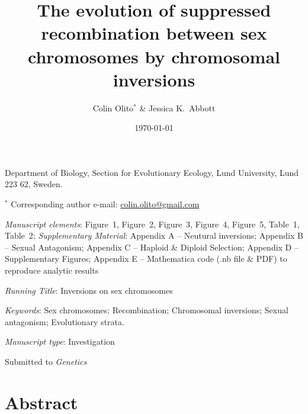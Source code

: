 \documentclass{article}
\title{The evolution of suppressed recombination between sex chromosomes by chromosomal inversions}
\author{Colin Olito$^{\ast}$ \& Jessica K.~Abbott}
\date{}
\begin{document}
\maketitle

\noindent{} Department of Biology, Section for Evolutionary Ecology, Lund University, Lund 223 62, Sweden.

\noindent{} $^{\ast}$ Corresponding author e-mail: \url{colin.olito@gmail.com}

\bigskip

\noindent{} \textit{Manuscript elements}: Figure~1, Figure~2, Figure~3, Figure~4, Figure~5, Table~1, Table~2; {\itshape Supplementary Material}: Appendix A -- Neutural inversions; Appendix B -- Sexual Antagonism; Appendix C -- Haploid \& Diploid Selection; Appendix D -- Supplementary Figures; Appendix E -- Mathematica code (.nb file \& PDF) to reproduce analytic results

\bigskip
\noindent{} \textit{Running Title}: Inversions on sex chromosomes

\bigskip

\noindent{} \textit{Keywords}: Sex chromosomes; Recombination; Chromosomal inversions; Sexual antagonism; Evolutionary strata.

\bigskip

\noindent{} \textit{Manuscript type}: Investigation

\bigskip

\begin{center} 
	Submitted to {\itshape Genetics} \date{\today}
\end{center}

\linenumbers
\modulolinenumbers[1]
\renewcommand\linenumberfont{\normalfont\small}


\newpage{}
\section*{Abstract}%
\end{document}
